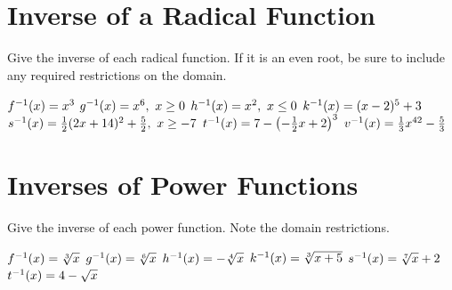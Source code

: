 \section*{Inverse of a Radical Function}
Give the inverse of each radical function.  If it is an even root, be sure to include any required restrictions on the domain.
\begin{smenum}
\mitemxxx
{$f^{-1}(x)=x^3$}
{$g^{-1}(x)=x^6,\ x\geq 0$}
{$h^{-1}(x)=x^2,\ x\leq 0$}
\mitemxx
{$k^{-1}(x)=(x-2)^5+3$}
{$s\inv(x)=\frac{1}{2}(2x+14)^2+\frac{5}{2},\ x\geq-7$}
\mitemxx
{$t^{-1}(x)=7-\left(-\frac{1}{2}x+2\right)^3$}
{$v^{-1}(x)=\frac{1}{3}x^{42}-\frac{5}{3}$}
\end{smenum}

\section*{Inverses of Power Functions}
Give the inverse of each power function.  Note the domain restrictions.
\begin{smenum}
\mitemxxx
{$f^{-1}(x)=\sqrt[3]{x}$}
{$g^{-1}(x)=\sqrt[6]{x}$}
{$h^{-1}(x)=-\sqrt[4]{x}$}
\mitemxxx
{$k^{-1}(x)=\sqrt[3]{x+5}$}
{$s^{-1}(x)=\sqrt[7]{x}+2$}
{$t^{-1}(x)=4-\sqrt{x}$}
\end{smenum}


